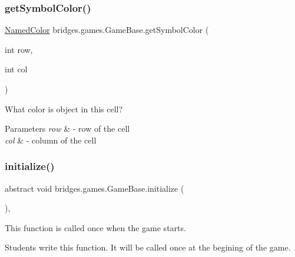 \subsubsection{\texorpdfstring{get\+Symbol\+Color()}{getSymbolColor()}}
{\footnotesize\ttfamily \hyperlink{enumbridges_1_1base_1_1_named_color}{Named\+Color} bridges.\+games.\+Game\+Base.\+get\+Symbol\+Color (\begin{DoxyParamCaption}\item[{int}]{row,  }\item[{int}]{col }\end{DoxyParamCaption})\hspace{0.3cm}{\ttfamily [protected]}}



What color is object in this cell? 


\begin{DoxyParams}{Parameters}
{\em row} & -\/ row of the cell \\
\hline
{\em col} & -\/ column of the cell \\
\hline
\end{DoxyParams}
\mbox{\label{classbridges_1_1games_1_1_game_base_a973a52d5eee7c29b01d668fba3c61657}} 
\subsubsection{\texorpdfstring{initialize()}{initialize()}}
{\footnotesize\ttfamily abstract void bridges.\+games.\+Game\+Base.\+initialize (\begin{DoxyParamCaption}{ }\end{DoxyParamCaption})\hspace{0.3cm}{\ttfamily [abstract]}, {\ttfamily [protected]}}



This function is called once when the game starts. 

Students write this function. It will be called once at the begining of the game. \mbox{\label{classbridges_1_1games_1_1_game_base_aa16a69dc83ee4e32150188e8acf1f897}} 
